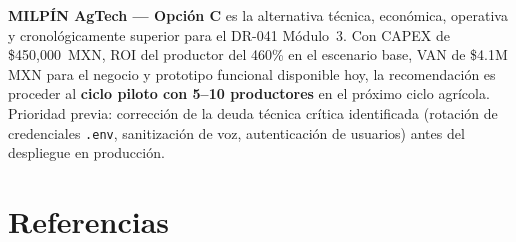 \documentclass[12pt,letterpaper]{article}
\begin{document}
\vspace{8pt}
\begin{recuadroVerde}[title=Conclusión del análisis de factibilidad]
\textbf{MILPÍN AgTech — Opción C} es la alternativa técnica, económica, operativa y
cronológicamente superior para el DR-041 Módulo~3. Con CAPEX de \$450{,}000~MXN, ROI del
productor del 460\% en el escenario base, VAN de \$4.1M MXN para el negocio y prototipo
funcional disponible hoy, la recomendación es proceder al \textbf{ciclo piloto con 5–10
productores} en el próximo ciclo agrícola. Prioridad previa: corrección de la deuda técnica
crítica identificada (rotación de credenciales \texttt{.env}, sanitización de voz, autenticación
de usuarios) antes del despliegue en producción.
\end{recuadroVerde}

\newpage

\section*{Referencias}
\end{document}

